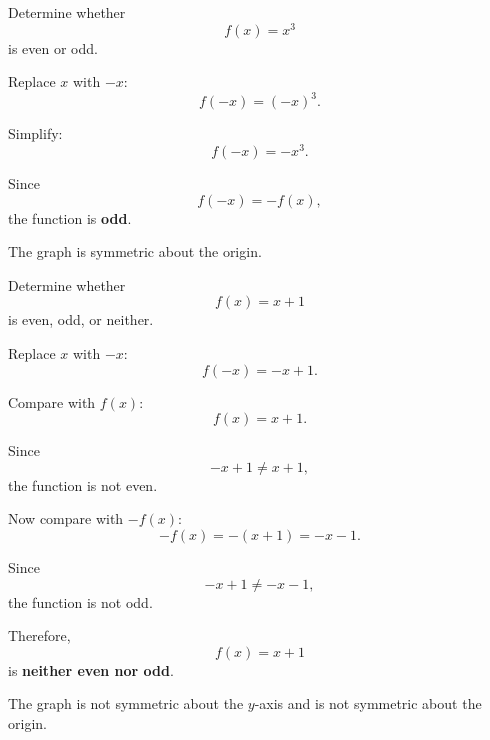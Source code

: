 \begin{examplebox}
    Determine whether
    \[
        f(x)=x^3
    \]
    is even or odd.

    Replace $x$ with $-x$:
    \[
        f(-x)=(-x)^3.
    \]

    Simplify:
    \[
        f(-x)=-x^3.
    \]

    Since
    \[
        f(-x)=-f(x),
    \]
    the function is \textbf{odd}.

    \begin{center}
    \end{center}

    The graph is symmetric about the origin.
\end{examplebox}

\begin{examplebox}
    Determine whether
    \[
        f(x)=x+1
    \]
    is even, odd, or neither.

    Replace $x$ with $-x$:
    \[
        f(-x)=-x+1.
    \]

    Compare with $f(x)$:
    \[
        f(x)=x+1.
    \]

    Since
    \[
        -x+1\neq x+1,
    \]
    the function is not even.

    Now compare with $-f(x)$:
    \[
        -f(x)=-(x+1)=-x-1.
    \]

    Since
    \[
        -x+1\neq -x-1,
    \]
    the function is not odd.

    Therefore,
    \[
        f(x)=x+1
    \]
    is \textbf{neither even nor odd}.

    \begin{center}
    \end{center}

    The graph is not symmetric about the $y$-axis and is not symmetric about the origin.
\end{examplebox}

